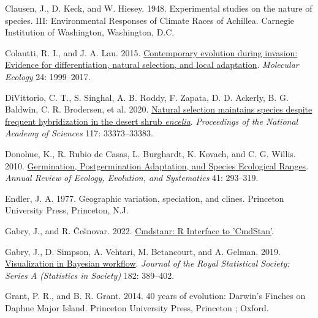 \documentclass[
  12pt,
]{article}
\newlength{\cslhangindent}
\newlength{\cslentryspacingunit} %
\newenvironment{CSLReferences}[2] %
 {%
  \setlength{\parindent}{0pt}
  \ifodd #1
  \let\oldpar\par
  \def\par{\hangindent=\cslhangindent\oldpar}
  \fi
  \setlength{\parskip}{#2\cslentryspacingunit}
 }%
 {}
\begin{document}
\begin{CSLReferences}{1}{0}
\leavevmode{}%
Clausen, J., D. Keck, and W. Hiesey. 1948. Experimental studies on the nature of species. {III}: {Environmental} {Responses} of {Climate} {Races} of {Achillea}. Carnegie Institution of Washington, Washington, D.C.

\leavevmode{}%
Colautti, R. I., and J. A. Lau. 2015. \href{https://doi.org/10.1111/mec.13162}{Contemporary evolution during invasion: Evidence for differentiation, natural selection, and local adaptation}. \emph{Molecular Ecology} 24: 1999--2017.

\leavevmode{}%
DiVittorio, C. T., S. Singhal, A. B. Roddy, F. Zapata, D. D. Ackerly, B. G. Baldwin, C. R. Brodersen, et al. 2020. \href{https://doi.org/10.1073/pnas.2001337117}{Natural selection maintains species despite frequent hybridization in the desert shrub \emph{encelia}}. \emph{Proceedings of the National Academy of Sciences} 117: 33373--33383.

\leavevmode{}%
Donohue, K., R. Rubio de Casas, L. Burghardt, K. Kovach, and C. G. Willis. 2010. \href{https://doi.org/10.1146/annurev-ecolsys-102209-144715}{Germination, {Postgermination} {Adaptation}, and {Species} {Ecological} {Ranges}}. \emph{Annual Review of Ecology, Evolution, and Systematics} 41: 293--319.

\leavevmode{}%
Endler, J. A. 1977. Geographic variation, speciation, and clines. Princeton University Press, Princeton, N.J.

\leavevmode{}%
Gabry, J., and R. Češnovar. 2022. \href{https://mc-stan.org/cmdstanr,\%20https://discourse.mc-stan.org}{Cmdstanr: {R} {Interface} to '{CmdStan}'}.

\leavevmode{}%
Gabry, J., D. Simpson, A. Vehtari, M. Betancourt, and A. Gelman. 2019. \href{https://doi.org/10.1111/rssa.12378}{Visualization in {Bayesian} workflow}. \emph{Journal of the Royal Statistical Society: Series A (Statistics in Society)} 182: 389--402.

\leavevmode{}%
Grant, P. R., and B. R. Grant. 2014. 40 years of evolution: {Darwin}'s {Finches} on {Daphne} {Major} {Island}. Princeton University Press, Princeton ; Oxford.


\end{CSLReferences}
\end{document}
